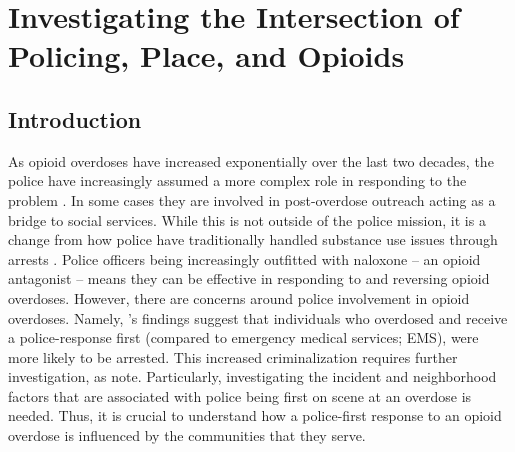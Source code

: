\chapter{Investigating the Intersection of Policing, Place, and Opioids}



\section{\centering Introduction}
As opioid overdoses have increased exponentially over the last two decades, the police have increasingly assumed a more complex role in responding to the problem \parencite{quinn_most_2019, ray_national_2023}. In some cases they are involved in post-overdose outreach \parencite{formica_characteristics_2021,ray_national_2023} acting as a bridge to social services. While this is not outside of the police mission, it is a change from how police have traditionally handled substance use issues through arrests \parencite{cooper_war_2015}. Police officers being increasingly outfitted with naloxone -- an opioid antagonist -- means they can be effective in responding to and reversing opioid overdoses. However, there are concerns around police involvement in opioid overdoses. Namely, \textcite{lowder_twoyear_2020}'s findings suggest that individuals who overdosed and receive a police-response first (compared to emergency medical services; EMS), were more likely to be arrested. This increased criminalization requires further investigation, as \textcite{lowder_twoyear_2020} note. Particularly, investigating the incident and neighborhood factors that are associated with police being first on scene at an overdose is needed. Thus, it is crucial to understand how a police-first response to an opioid overdose is influenced by the communities that they serve.

